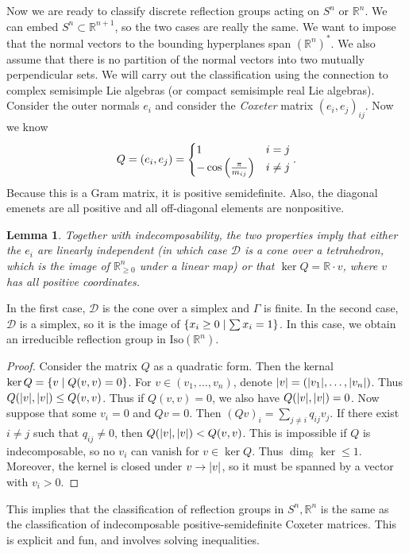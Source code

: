 \documentclass[leqno, openany]{memoir}
\newtheorem{lem}[thm]{Lemma}
\theoremstyle{definition}
\theoremstyle{remark}
\theoremstyle{plain}
\theoremstyle{definition}
\theoremstyle{remark}
\newcommand{\R}{\mathbb{R}}
\newcommand{\mc}[1]{\mathcal{#1}}
\newcommand{\mr}[1]{\mathrm{#1}}
\begin{document}
Now we are ready to classify discrete reflection groups acting on $S^n$ or $\R^n$. We can embed $S^n \subset \R^{n+1}$, so the two cases are really the same. We want to impose that the normal vectors to the bounding hyperplanes span ${(\R^n)}^*$. We also assume that there is no partition of the normal vectors into two mutually perpendicular sets. We will carry out the classification using the connection to complex semisimple Lie algebras (or compact semisimple real Lie algebras). Consider the outer normals $e_i$ and consider the \textit{Coxeter} matrix ${(e_i, e_j)}_{ij}$. Now we know 
\[ Q = (e_i, e_j) = \begin{cases}
    1 & i = j \\
    - \cos \qty(\frac{\pi}{m_{ij}}) & i \neq j
\end{cases}. \]
Because this is a Gram matrix, it is positive semidefinite. Also, the diagonal emenets are all positive and all off-diagonal elements are nonpositive. 

\begin{lem}
    Together with indecomposability, the two properties imply that either the $e_i$ are linearly independent (in which case $\mc{D}$ is a cone over a tetrahedron, which is the image of $\R_{\geq 0}^n$ under a linear map) or that $\ker Q = \R \cdot v$, where $v$ has all positive coordinates.
\end{lem}

In the first case, $\mc{D}$ is the cone over a simplex and $\Gamma$ is finite. In the second case, $\mc{D}$ is a simplex, so it is the image of $\qty{x_i \geq 0 \mid \sum x_i = 1}$. In this case, we obtain an irreducible reflection group in $\mr{Iso}(\R^n)$.

\begin{proof}
    Consider the matrix $Q$ as a quadratic form. Then the kernal $\ker Q = \qty{v \mid Q(v,v) = 0}$. For $v \in (v_1, \ldots, v_n)$, denote $\abs{v} = (\abs{v_1}, \ldots, \abs{v_n})$. Thus $Q(\abs{v}, \abs{v}) \leq Q(v,v)$. Thus if $Q(v,v) = 0$, we also have $Q(\abs{v}, \abs{v}) = 0$. Now suppose that some $v_i = 0$ and $Qv = 0$. Then ${(Qv)}_i = \sum_{j \neq i} q_{ij} v_j$. If there exist $i \neq j$ such that $q_{ij} \neq 0$, then $Q(\abs{v}, \abs{v}) < Q(v,v)$. This is impossible if $Q$ is indecomposable, so no $v_i$ can vanish for $v \in \ker Q$. Thus $\dim_{\R} \ker \leq 1$. Moreover, the kernel is closed under $v \to \abs{v}$, so it must be spanned by a vector with $v_i > 0$.
\end{proof}

This implies that the classification of reflection groups in $S^n, \R^n$ is the same as the classification of indecomposable positive-semidefinite Coxeter matrices. This is explicit and fun, and involves solving inequalities. 
\end{document}
